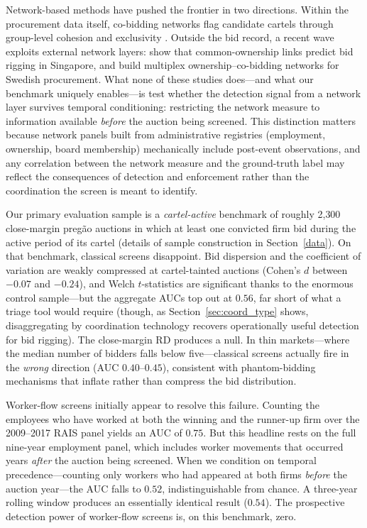 Network-based methods have pushed the frontier in two directions. Within the procurement data itself, co-bidding networks flag candidate cartels through group-level cohesion and exclusivity \citep{wachs2019network, signor2020detection, huber2019machine, clark2018bid}. Outside the bid record, a recent wave exploits external network layers: \citet{asai2026ownership} show that common-ownership links predict bid rigging in Singapore, and \citet{villamil2024collusion} build multiplex ownership--co-bidding networks for Swedish procurement. What none of these studies does---and what our benchmark uniquely enables---is test whether the detection signal from a network layer survives temporal conditioning: restricting the network measure to information available \emph{before} the auction being screened. This distinction matters because network panels built from administrative registries (employment, ownership, board membership) mechanically include post-event observations, and any correlation between the network measure and the ground-truth label may reflect the consequences of detection and enforcement rather than the coordination the screen is meant to identify.

Our primary evaluation sample is a \emph{cartel-active} benchmark of roughly 2{,}300 close-margin preg\~{a}o auctions in which at least one convicted firm bid during the active period of its cartel (details of sample construction in Section~\ref{data}). On that benchmark, classical screens disappoint. Bid dispersion and the coefficient of variation are weakly compressed at cartel-tainted auctions (Cohen's $d$ between $-0.07$ and $-0.24$), and Welch $t$-statistics are significant thanks to the enormous control sample---but the aggregate AUCs top out at $0.56$, far short of what a triage tool would require (though, as Section~\ref{sec:coord_type} shows, disaggregating by coordination technology recovers operationally useful detection for bid rigging). The close-margin RD produces a null. In thin markets---where the median number of bidders falls below five---classical screens actually fire in the \emph{wrong} direction (AUC $0.40$--$0.45$), consistent with phantom-bidding mechanisms that inflate rather than compress the bid distribution.

Worker-flow screens initially appear to resolve this failure. Counting the employees who have worked at both the winning and the runner-up firm over the 2009--2017 RAIS panel yields an AUC of $0.75$. But this headline rests on the full nine-year employment panel, which includes worker movements that occurred years \emph{after} the auction being screened. When we condition on temporal precedence---counting only workers who had appeared at both firms \emph{before} the auction year---the AUC falls to $0.52$, indistinguishable from chance. A three-year rolling window produces an essentially identical result ($0.54$). The prospective detection power of worker-flow screens is, on this benchmark, zero.

